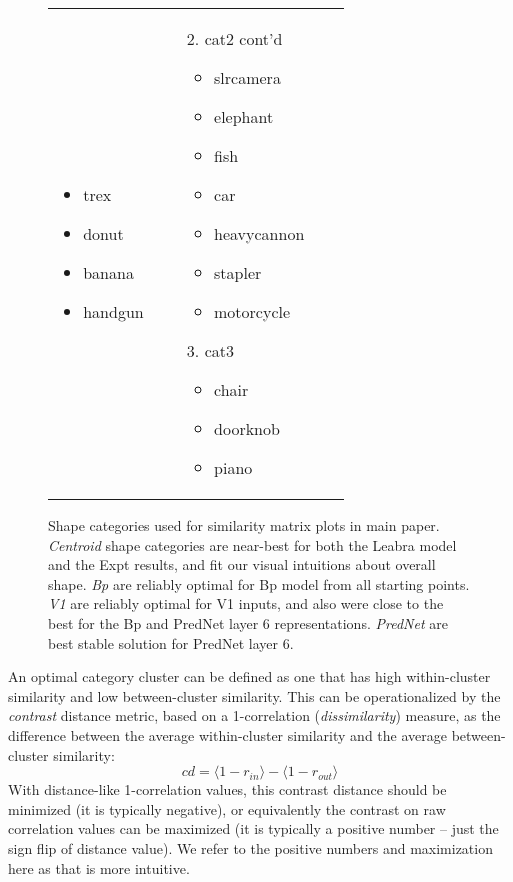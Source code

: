 \begin{figure}
\begin{tabular}{llll}
{\begin{enumerate}
\begin{itemize}[leftmargin=*]
	\item trex
	\item donut
	\item banana
	\item handgun
	\end{itemize}
	\end{enumerate}
	} & 
	 \parbox[t]{1.4in}{\raggedright 	{} \small
	\begin{enumerate}
	\item[2.] cat2 cont'd
	\begin{itemize}[leftmargin=*]
	\item slrcamera
	\item elephant
	\item fish
	\item car
	\item heavycannon
	\item stapler
	\item motorcycle
	\end{itemize}
	\item[3.] cat3
	\begin{itemize}[leftmargin=*]
	\item chair
	\item doorknob
	\item piano
	\end{itemize}
	\end{enumerate}
	}\\
	\end{tabular}
	\caption{\footnotesize Shape categories used for similarity matrix plots in main paper.  {\em Centroid} shape categories are near-best for both the Leabra model and the Expt results, and fit our visual intuitions about overall shape. {\em Bp} are reliably optimal for Bp model from all starting points.  {\em V1} are reliably optimal for V1 inputs, and also were close to the best for the Bp and PredNet layer 6 representations.  {\em PredNet} are best stable solution for PredNet layer 6.}
	\label{fig.cats}
\end{figure}

An optimal category cluster can be defined as one that has high within-cluster similarity and low between-cluster similarity.  This can be operationalized by the {\em contrast} distance metric, based on a 1-correlation ({\em dissimilarity}) measure, as the difference between the average within-cluster similarity and the average between-cluster similarity:
\begin{equation}
 cd = \langle 1-r_{in} \rangle - \langle 1-r_{out} \rangle 
\end{equation}
With distance-like 1-correlation values, this contrast distance should be minimized (it is typically negative), or equivalently the contrast on raw correlation values can be maximized (it is typically a positive number -- just the sign flip of distance value).  We refer to the positive numbers and maximization here as that is more intuitive.

